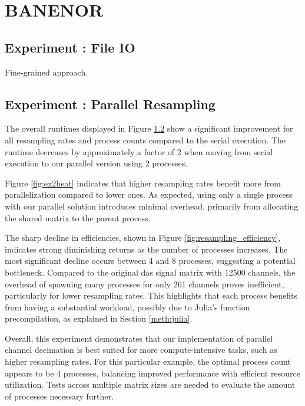 \section{BANENOR}
\label{disc:banenor}

\subsection{Experiment : File IO}


Fine-grained approach. \\

\subsection{Experiment : Parallel Resampling}

\label{fig:resampling-benchmark}
The overall runtimes displayed in Figure \ref{fig:resampling-benchmark} show a significant improvement for all resampling rates and process counts compared to the serial execution. The runtime decreases by approximately a factor of 2 when moving from serial execution to our parallel version using 2 processes.

Figure \ref{fig:ex2heat} indicates that higher resampling rates benefit more from parallelization compared to lower ones. As expected, using only a single process with our parallel solution introduces minimal overhead, primarily from allocating the shared matrix to the parent process.

The sharp decline in efficiencies, shown in Figure \ref{fig:resampling_efficiency}, indicates strong diminishing returns as the number of processes increases. The most significant decline occurs between 4 and 8 processes, suggesting a potential bottleneck. Compared to the original \acrshort{das} signal matrix with 12500 channels, the overhead of spawning many processes for only 261 channels proves inefficient, particularly for lower resampling rates. This highlights that each process benefits from having a substantial workload, possibly due to Julia's function precompilation, as explained in Section \ref{meth:julia}.

Overall, this experiment demonstrates that our implementation of parallel channel decimation is best suited for more compute-intensive tasks, such as higher resampling rates. For this particular example, the optimal process count appears to be 4 processes, balancing improved performance with efficient resource utilization. Tests across multiple matrix sizes are needed to evaluate the amount of processes necessary further.
